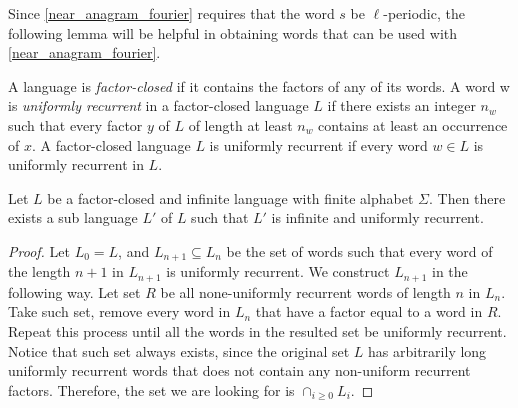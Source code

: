 \documentclass{patmorin}
\begin{document}
Since \cref{near_anagram_fourier} requires that the word $s$ be $\ell$-periodic, the following lemma will be helpful in obtaining words that can be used with \cref{near_anagram_fourier}.

A language is \emph{factor-closed} if it contains the factors of any of its words. A word w is \emph{uniformly recurrent} in a factor-closed language $L$ if there exists an integer $n_w$ such that every factor $y$ of $L$ of length at least $n_w$ contains at least an occurrence of $x$. A factor-closed language $L$ is uniformly recurrent if every word $w \in L$ is uniformly recurrent in $L$.

    

\begin{thm}\label{sub_lang_recurrency}
Let $L$ be a factor-closed and infinite language with finite alphabet $\Sigma$. Then there exists a sub language $L'$ of $L$ such that $L'$ is infinite and uniformly recurrent.
\end{thm}

\begin{proof}
    Let $L_0 = L$, and $L_{n+1} \subseteq L_{n}$ be the set of words such that every word of the length $n+1$ in $L_{n+1}$ is uniformly recurrent.
   We construct $L_{n+1}$ in the following way. Let set $R$ be all none-uniformly recurrent words of length $n$ in $L_n$. Take such set, remove every word in $L_n$ that have a factor equal to a word in $R$. Repeat this process until all the words in the resulted set be uniformly recurrent. Notice that such set always exists, since the original set $L$ has arbitrarily long uniformly recurrent words that does not contain any non-uniform recurrent factors. Therefore, the set we are looking for is $\cap_{i\ge0} L_i$.
\end{proof}

\end{document}
